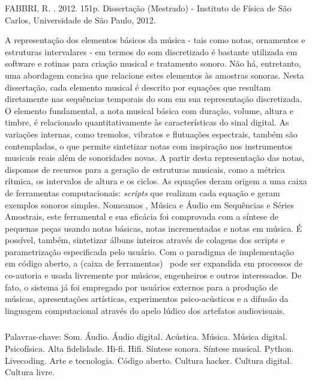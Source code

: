 \begin{resumo2}
\vspace{-10mm}
FABBRI, R. \textbf{\ABNTtitulodata}. 2012. 151p. Dissertação (Mestrado) - Instituto de Física de São Carlos, Universidade de São Paulo, 2012.
\vspace{15mm}

A representação dos elementos básicos da música - tais como notas, ornamentos e estruturas intervalares - em termos do som discretizado é bastante utilizada em software e rotinas para criação musical e tratamento sonoro. Não há, entretanto, uma abordagem concisa que relacione estes elementos às amostras sonoras. Nesta dissertação, cada elemento musical é descrito por equações que resultam diretamente nas sequências temporais do som em sua representação discretizada. O elemento fundamental, a nota musical básica com duração, volume, altura e timbre, é relacionado quantitativamente às características do sinal digital. As variações internas, como tremolos, vibratos e flutuações espectrais, também são contempladas, o que permite sintetizar notas com inspiração nos instrumentos musicais reais além de sonoridades novas. A partir desta representação das notas, dispomos de recursos para a geração de estruturas musicais, como a métrica rítmica, os intervalos de altura e os ciclos. As equações deram origem a uma caixa de ferramentas computacionais: \emph{scripts} que realizam cada equação e geram exemplos sonoros simples. Nomeamos \massa, Música e Áudio em Sequências e Séries Amostrais, este ferramental e sua eficácia foi comprovada com a síntese de pequenas peças usando notas básicas, notas incrementadas e notas em música. É possível, também, sintetizar álbuns inteiros através de colagens dos scripts e parametrização especificada pelo usuário. Com o paradigma de implementação em código aberto, a (caixa de ferramentas) \massa\  pode ser expandida em processos de co-autoria e usada livremente por músicos, engenheiros e outros interessados. De fato, o sistema já foi empregado por usuários externos para a produção de músicas, apresentações artísticas, experimentos psico-acústicos e a difusão da linguagem computacional através do apelo lúdico dos artefatos audiovisuais.


$\phantom{linha em branco}$\\
Palavras-chave: Som. Áudio. Áudio digital. Acústica. Música. Música digital. Psicofísica. Alta fidelidade. Hi-fi. Hifi. Síntese sonora. Síntese musical. Python. Livecoding. Arte e tecnologia. Código aberto. Cultura hacker. Cultura digital. Cultura livre.

\end{resumo2}


